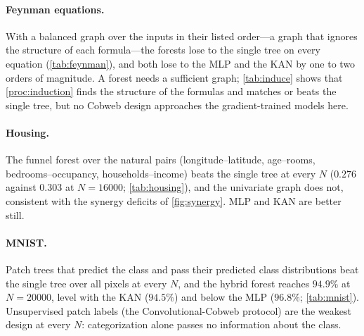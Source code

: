 \documentclass[11pt]{article}
\theoremstyle{definition}
\theoremstyle{remark}
\begin{document}
\begin{table}[t]
\centering\small
\resizebox{\linewidth}{!}{}
\caption{California housing: test RMSE of the log median value (three seeds).}
\label{tab:housing}
\end{table}

\begin{table}[t]
\centering\small

\caption{MNIST, accuracy (\%, three seeds).  Forests have one tree per $7\times7$
patch; ``label'' is the Convolutional-Cobweb protocol, ``act'' passes each patch tree's
predicted class distribution.}
\label{tab:mnist}
\end{table}

\begin{table}[t]
\centering\small

\caption{Next word on OpenWebText from the previous four words (2000-word vocabulary):
top-1 accuracy (\%) / cross-entropy (nats).  An accuracy of 20.9 is the frequency of the
unknown-word token.}
\label{tab:owt}
\end{table}

\paragraph{Feynman equations.}
With a balanced graph over the inputs in their listed order---a graph that ignores the
structure of each formula---the forests lose to the single tree on every equation
(\cref{tab:feynman}), and both lose to the MLP and the KAN by one to two orders of
magnitude.  A forest needs a sufficient graph; \cref{tab:induce} shows that
\cref{proc:induction} finds the structure of the formulas and matches or beats the
single tree, but no Cobweb design approaches the gradient-trained models here.

\paragraph{Housing.}
The funnel forest over the natural pairs (longitude--latitude, age--rooms,
bedrooms--occupancy, households--income) beats the single tree at every $N$
($0.276$ against $0.303$ at $N=16000$; \cref{tab:housing}), and the univariate graph
does not, consistent with the synergy deficits of \cref{fig:synergy}.  MLP and KAN are
better still.

\paragraph{MNIST.}
Patch trees that predict the class and pass their predicted class distributions beat the
single tree over all pixels at every $N$, and the hybrid forest reaches $94.9\%$ at
$N=20000$, level with the KAN ($94.5\%$) and below the MLP ($96.8\%$;
\cref{tab:mnist}).  Unsupervised patch labels (the Convolutional-Cobweb protocol) are
the weakest design at every $N$: categorization alone passes no information about the
class.
\end{document}

